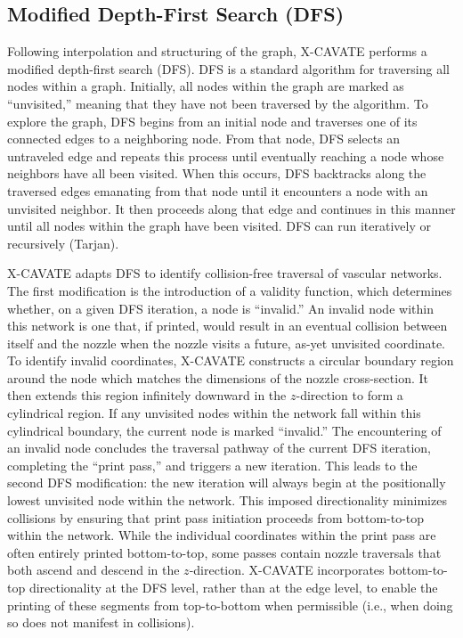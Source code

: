 \documentclass[11pt,letterpaper]{article}
\begin{document}
\subsection{Modified Depth-First Search (DFS)}

Following interpolation and structuring of the graph, X-CAVATE performs a
modified depth-first search (DFS). DFS is a standard algorithm for traversing
all nodes within a graph. Initially, all nodes within the graph are marked as
``unvisited,'' meaning that they have not been traversed by the algorithm. To
explore the graph, DFS begins from an initial node and traverses one of its
connected edges to a neighboring node. From that node, DFS selects an
untraveled edge and repeats this process until eventually reaching a node whose
neighbors have all been visited. When this occurs, DFS backtracks along the
traversed edges emanating from that node until it encounters a node with an
unvisited neighbor. It then proceeds along that edge and continues in this
manner until all nodes within the graph have been visited. DFS can run
iteratively or recursively (Tarjan).

X-CAVATE adapts DFS to identify collision-free traversal of vascular networks.
The first modification is the introduction of a validity function, which
determines whether, on a given DFS iteration, a node is ``invalid.'' An
invalid node within this network is one that, if printed, would result in an
eventual collision between itself and the nozzle when the nozzle visits a
future, as-yet unvisited coordinate. To identify invalid coordinates,
X-CAVATE constructs a circular boundary region around the node which matches
the dimensions of the nozzle cross-section. It then extends this region
infinitely downward in the $z$-direction to form a cylindrical region. If any
unvisited nodes within the network fall within this cylindrical boundary, the
current node is marked ``invalid.'' The encountering of an invalid node
concludes the traversal pathway of the current DFS iteration, completing the
``print pass,'' and triggers a new iteration. This leads to the second DFS
modification: the new iteration will always begin at the positionally lowest
unvisited node within the network. This imposed directionality minimizes
collisions by ensuring that print pass initiation proceeds from bottom-to-top
within the network. While the individual coordinates within the print pass
are often entirely printed bottom-to-top, some passes contain nozzle
traversals that both ascend and descend in the $z$-direction. X-CAVATE
incorporates bottom-to-top directionality at the DFS level, rather than at the
edge level, to enable the printing of these segments from top-to-bottom when
permissible (i.e., when doing so does not manifest in collisions).
\end{document}
